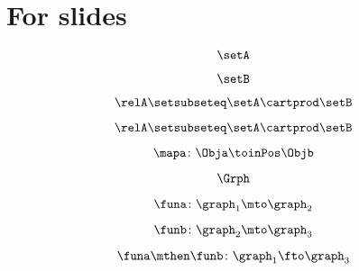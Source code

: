 
\section[For slides]{For slides}


\begin{forslides}
  
        \begin{equation}
            \label{eq:cats-of-structures-00}
            \setA
        \end{equation}

        \begin{equation}
            \label{eq:cats-of-structures-01}
            \setB
        \end{equation}

        \begin{equation}
            \label{eq:cats-of-structures-02}
            \relA \setsubseteq \setA \cartprod \setB
        \end{equation}

        \begin{equation}
            \label{eq:cats-of-structures-03}
            \relA \setsubseteq \setA \cartprod \setB
        \end{equation}

        \begin{equation}
            \label{eq:cats-of-structures-04}
            \mapa \colon \Obja \toinPos \Objb
        \end{equation}

        \begin{equation}
            \label{eq:cats-of-structures-05}
            \Grph
        \end{equation}

        \begin{equation}
            \label{eq:cats-of-structures-06}
            \funa\colon \graph_1\mto \graph_2
        \end{equation}

        \begin{equation}
            \label{eq:cats-of-structures-07}
            \funb\colon \graph_2\mto \graph_3
        \end{equation}

        \begin{equation}
            \label{eq:cats-of-structures-08}
            \funa\mthen \funb \colon \graph_1 \fto \graph_3
        \end{equation}


\end{forslides}
